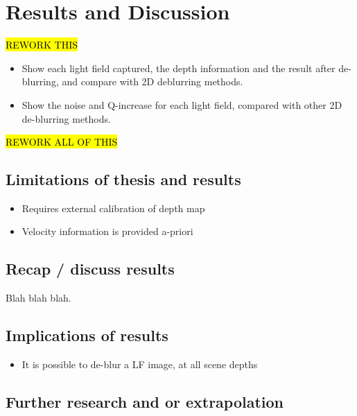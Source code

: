 
\chapter{Results and Discussion}
\label{chap:results_and_discussion}

\hl{REWORK THIS}

\begin{itemize}

\item Show each light field captured, the depth information and the result after de-blurring, and compare with 2D deblurring methods.

\item Show the noise and Q-increase for each light field, compared with other 2D de-blurring methods.

\end{itemize}


\hl{REWORK ALL OF THIS}

\section{Limitations of thesis and results}

\begin{itemize}
\item Requires external calibration of depth map
\item Velocity information is provided a-priori
\end{itemize}


\section{Recap / discuss results}

Blah blah blah.

\section{Implications of results}

\begin{itemize}
\item It is possible to de-blur a LF image, at all scene depths
\end{itemize}


\section{Further research and or extrapolation}

